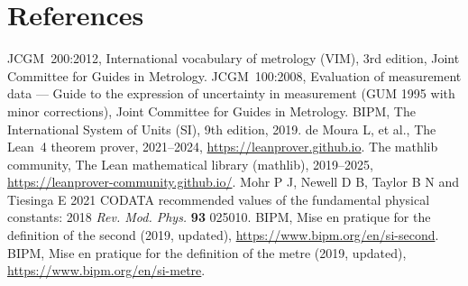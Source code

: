 \documentclass[11pt]{article}
\theoremstyle{plain}
\theoremstyle{definition}
\theoremstyle{remark}
\begin{document}
\section*{References}
\begin{thebibliography}{9}
 JCGM~200:2012, International vocabulary of metrology (VIM), 3rd edition, Joint Committee for Guides in Metrology.
 JCGM~100:2008, Evaluation of measurement data — Guide to the expression of uncertainty in measurement (GUM 1995 with minor corrections), Joint Committee for Guides in Metrology.
 BIPM, The International System of Units (SI), 9th edition, 2019.
 de Moura L, et al., The Lean~4 theorem prover, 2021--2024, \url{https://leanprover.github.io}.
 The mathlib community, The Lean mathematical library (mathlib), 2019--2025, \url{https://leanprover-community.github.io/}.
 Mohr P J, Newell D B, Taylor B N and Tiesinga E 2021 CODATA recommended values of the fundamental physical constants: 2018 \textit{Rev. Mod. Phys.} \textbf{93} 025010.
 BIPM, Mise en pratique for the definition of the second (2019, updated), \url{https://www.bipm.org/en/si-second}.
 BIPM, Mise en pratique for the definition of the metre (2019, updated), \url{https://www.bipm.org/en/si-metre}.
\end{thebibliography}
\end{document}
